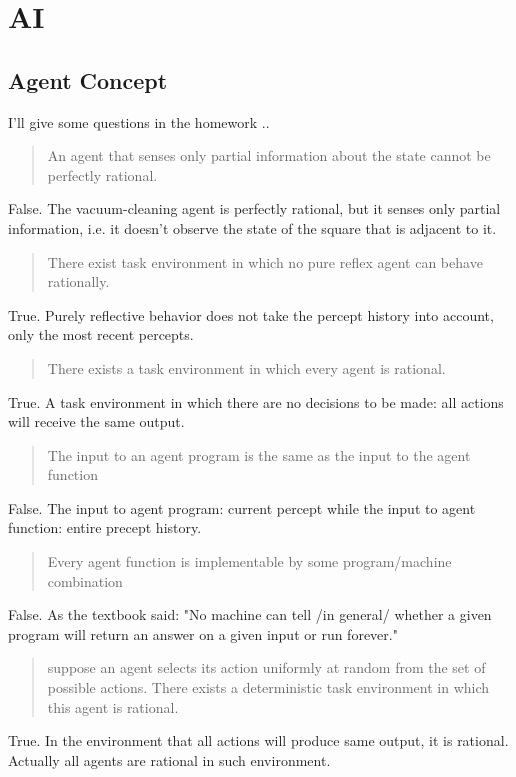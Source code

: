 \section{AI}

\subsection{Agent Concept}

I'll give some questions in the homework ..

\begin{quote}
  An agent that senses only partial information about the state cannot
  be perfectly rational.
\end{quote}

False. The vacuum-cleaning agent is perfectly rational, but it senses
only partial information, i.e. it doesn't observe the state of the
square that is adjacent to it.

\begin{quote}
  There exist task environment in which no pure reflex agent can
  behave rationally.
\end{quote}
True. Purely reflective behavior does not take the percept history
into account, only the most recent percepts.

\begin{quote}
  There exists a task environment in which every agent is rational.
\end{quote}
True.  A task environment in which there are no decisions to be made:
all actions will receive the same output.

\begin{quote}
  The input to an agent program is the same as the input to the agent
  function
\end{quote}
False. The input to agent program: current percept while the input to
agent function: entire precept history.

\begin{quote}
  Every agent function is implementable by some program/machine
  combination
\end{quote}
False. As the textbook said: "No machine can tell /in general/ whether
a given program will return an answer on a given input or run
forever."

\begin{quote}
  suppose an agent selects its action uniformly at random from the set
  of possible actions.  There exists a deterministic task environment
  in which this agent is rational.
\end{quote}
True.  In the environment that all actions will produce same output,
it is rational.  Actually all agents are rational in such environment.

